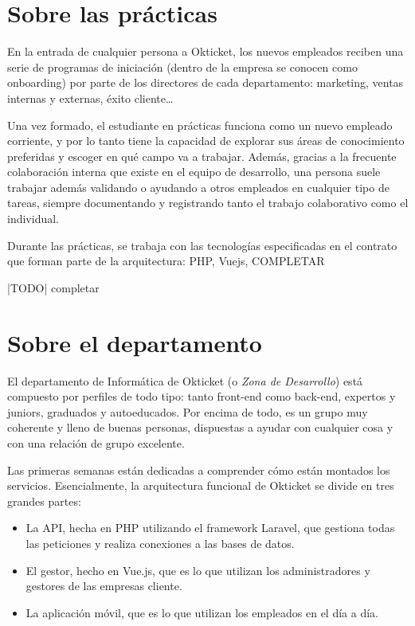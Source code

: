 \section{Sobre las prácticas}
En la entrada de cualquier persona a Okticket, los nuevos empleados reciben una serie de
programas de iniciación (dentro de la empresa se conocen como onboarding) por parte de
los directores de cada departamento: marketing, ventas internas y externas, éxito cliente…

Una vez formado, el estudiante en prácticas funciona como un nuevo empleado corriente, y
por lo tanto tiene la capacidad de explorar sus áreas de conocimiento preferidas y escoger
en qué campo va a trabajar. Además, gracias a la frecuente colaboración interna que existe
en el equipo de desarrollo, una persona suele trabajar además validando o ayudando a otros
empleados en cualquier tipo de tareas, siempre documentando y registrando tanto el trabajo
colaborativo como el individual.

Durante las prácticas, se trabaja con las tecnologías especificadas en el contrato que
forman parte de la arquitectura: PHP, Vuejs, COMPLETAR

|TODO| completar

\section{Sobre el departamento}
El departamento de Informática de Okticket (o \textit{Zona de Desarrollo}) está compuesto por perfiles
de todo tipo: tanto front-end como back-end, expertos y juniors, graduados y autoeducados.
Por encima de todo, es un grupo muy coherente y lleno de buenas personas, dispuestas a ayudar
con cualquier cosa y con una relación de grupo excelente.

Las primeras semanas están dedicadas a comprender cómo están montados los servicios.
Esencialmente, la arquitectura funcional de Okticket se divide en tres grandes partes:
\begin{itemize}
	\item La API, hecha en PHP utilizando el framework Laravel, que gestiona todas las
		peticiones y realiza conexiones a las bases de datos.
	\item El gestor, hecho en Vue.js, que es lo que utilizan los administradores y gestores
		de las empresas cliente.
	\item La aplicación móvil, que es lo que utilizan los empleados en el día a día.
\end{itemize}

